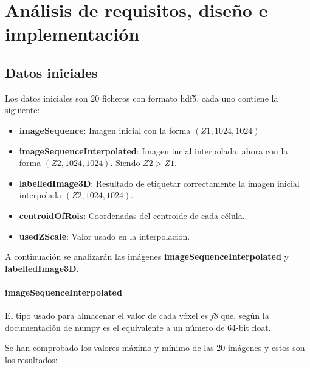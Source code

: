 \chapter{An\'alisis de requisitos, dise\~no e implementaci\'on}\label{requisitos}

\section{Datos iniciales}\label{sub:datos_entrada}

Los datos iniciales son 20 ficheros con formato hdf5, cada uno contiene la siguiente:

\begin{itemize}
\item \textbf{imageSequence}: Imagen inicial con la forma $ (Z1, 1024, 1024) $
\item \textbf{imageSequenceInterpolated}: Imagen incial interpolada, ahora con la forma $ (Z2, 1024, 1024) $. Siendo $ Z2 > Z1 $. 
\item \textbf{labelledImage3D}: Resultado de etiquetar correctamente la imagen inicial interpolada $ (Z2, 1024, 1024) $.
\item \textbf{centroidOfRois}: Coordenadas del centroide de cada célula.
\item \textbf{usedZScale}: Valor usado en la interpolación.
\end{itemize}

A continuación se analizarán las imágenes \textbf{imageSequenceInterpolated} y \textbf{labelledImage3D}.

\subsubsection{imageSequenceInterpolated}

El tipo usado para almacenar el valor de cada vóxel es \textit{f8} que, según la documentación de numpy es el equivalente a un número de 64-bit float.

Se han comprobado los valores máximo y mínimo de las 20 imágenes y estos son los resultados:


